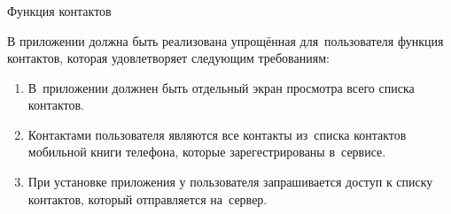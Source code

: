 \subsubsection{} Функция контактов
\label{sec:analysis:research:funcreq:contacts}

В приложении должна быть реализована упрощённая для~пользователя функция контактов, которая удовлетворяет следующим требованиям:

\begin{enumerate}
	\item В~приложении должнен быть отдельный экран просмотра всего списка контактов.
	\item Контактами пользователя являются все контакты из~списка контактов мобильной книги телефона, которые зарегестрированы в~сервисе.
	\item При установке приложения у пользователя запрашивается доступ к списку контактов, который отправляется на~сервер.
\end{enumerate}